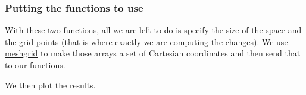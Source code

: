 \begin{Shaded}
\begin{Highlighting}[]
\OperatorTok{=} \OperatorTok{*}\OperatorTok{/}
\OperatorTok{=}\OperatorTok{/}
    
    
\OperatorTok{=}\OperatorTok{{-}}\OperatorTok{*}\OperatorTok{*}
\OperatorTok{=}\OperatorTok{/}
\OperatorTok{=}\OperatorTok{*}\OperatorTok{*}\OperatorTok{+}
\OperatorTok{=} \OperatorTok{{-}}\OperatorTok{*}\OperatorTok{*}\OperatorTok{*}\OperatorTok{+}
    
\end{Highlighting}
\end{Shaded}

\subsubsection{Putting the functions to
use}\label{putting-the-functions-to-use}

With these two functions, all we are left to do is specify the size of
the space and the grid points (that is where exactly we are computing
the changes). We use
\href{https://numpy.org/doc/stable/reference/generated/numpy.meshgrid.html}{meshgrid}
to make those arrays a set of Cartesian coordinates and then send that
to our functions.

We then plot the results.

